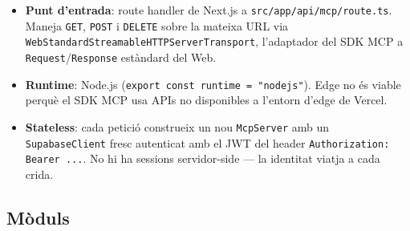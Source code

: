\begin{itemize}
    \item \textbf{Punt d'entrada}: route handler de Next.js a
        \texttt{src/app/api/mcp/route.ts}. Maneja \texttt{GET},
        \texttt{POST} i \texttt{DELETE} sobre la mateixa URL via
        \texttt{WebStandardStreamableHTTPServerTransport}, l'adaptador
        del SDK MCP a \texttt{Request}/\texttt{Response} estàndard
        del Web.
    \item \textbf{Runtime}: Node.js (\texttt{export const runtime =
        "nodejs"}). Edge no és viable perquè el SDK MCP usa APIs
        no disponibles a l'entorn d'edge de Vercel.
    \item \textbf{Stateless}: cada petició construeix un nou
        \texttt{McpServer} amb un \texttt{SupabaseClient} fresc
        autenticat amb el JWT del header \texttt{Authorization:
        Bearer ...}. No hi ha sessions servidor-side --- la
        identitat viatja a cada crida.
\end{itemize}

\subsection{Mòduls}


